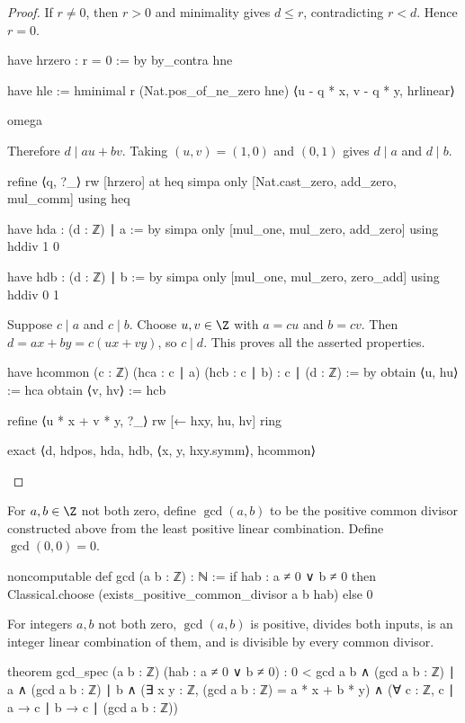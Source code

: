 \begin{proof}
  If $r\ne0$, then $r>0$ and minimality gives $d\le r$, contradicting $r<d$. Hence $r=0$.

  \begin{lean}
    have hrzero : r = 0 := by
      by_contra hne

      have hle := hminimal r (Nat.pos_of_ne_zero hne)
        ⟨u - q * x, v - q * y, hrlinear⟩

      omega
  \end{lean}

  Therefore $d\mid au+bv$. Taking $(u,v)=(1,0)$ and $(0,1)$ gives $d\mid a$ and $d\mid b$.

  \begin{lean}
      refine ⟨q, ?_⟩
      rw [hrzero] at heq
      simpa only [Nat.cast_zero, add_zero, mul_comm] using heq

    have hda : (d : ℤ) ∣ a := by
      simpa only [mul_one, mul_zero, add_zero] using hddiv 1 0

    have hdb : (d : ℤ) ∣ b := by
      simpa only [mul_one, mul_zero, zero_add] using hddiv 0 1
  \end{lean}

  Suppose $c\mid a$ and $c\mid b$. Choose $u,v\in\Z$ with $a=cu$ and $b=cv$. Then $d=ax+by=c(ux+vy)$, so $c\mid d$. This proves all the asserted properties.

  \begin{lean}
    have hcommon (c : ℤ) (hca : c ∣ a) (hcb : c ∣ b) : c ∣ (d : ℤ) := by
      obtain ⟨u, hu⟩ := hca
      obtain ⟨v, hv⟩ := hcb

      refine ⟨u * x + v * y, ?_⟩
      rw [← hxy, hu, hv]
      ring

    exact ⟨d, hdpos, hda, hdb, ⟨x, y, hxy.symm⟩, hcommon⟩
  \end{lean}
\end{proof}

\begin{definition}
  For $a,b\in\Z$ not both zero, define $\gcd(a,b)$ to be the positive common divisor constructed above from the least positive linear combination. Define $\gcd(0,0)=0$.

  \begin{lean}
    noncomputable def gcd (a b : ℤ) : ℕ :=
      if hab : a ≠ 0 ∨ b ≠ 0 then
        Classical.choose (exists_positive_common_divisor a b hab)
      else 0
  \end{lean}
\end{definition}

\begin{theorem} \label{nt:thm:gcd-spec}
  For integers $a,b$ not both zero, $\gcd(a,b)$ is positive, divides both inputs, is an integer linear combination of them, and is divisible by every common divisor.

  \begin{lean}
    theorem gcd_spec (a b : ℤ) (hab : a ≠ 0 ∨ b ≠ 0) :
        0 < gcd a b ∧ (gcd a b : ℤ) ∣ a ∧ (gcd a b : ℤ) ∣ b ∧
          (∃ x y : ℤ, (gcd a b : ℤ) = a * x + b * y) ∧
          (∀ c : ℤ, c ∣ a → c ∣ b → c ∣ (gcd a b : ℤ))
  \end{lean}
\end{theorem}

